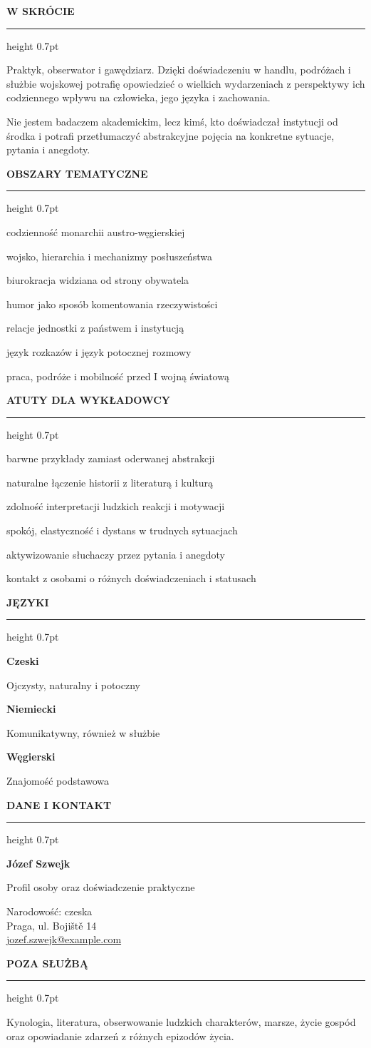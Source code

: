 \documentclass[9pt,a4paper]{article}
\newcommand{\cvsection}[2]{%
  \vspace{0.40em}%
  {\color{#1}\bfseries\fontsize{9.4}{10.6}\selectfont
    \MakeUppercase{#2}\par}%
  \vspace{0.06em}%
  {\color{#1}\hrule height 0.7pt}%
  \vspace{0.14em}%
}
\newcommand{\sideitem}[2]{%
  {\color{navy}\bfseries #1}\par
  {\color{ink}#2\par}
  \vspace{0.13em}%
}
\newcommand{\cvbullet}[1]{%
  \noindent{\color{gold}\textbullet}\hspace{0.42em}#1\par
  \vspace{0.13em}%
}
\begin{document}
\noindent
\begin{minipage}[t]{0.295\textwidth}
\vspace{0pt}

\colorbox{pale}{%
  \begin{minipage}[t]{\dimexpr\linewidth-2\fboxsep\relax}
  \vspace{0.14em}
  \raggedright
  \fontsize{8.45}{9.9}\selectfont

  \cvsection{teal}{W skrócie}
  Praktyk, obserwator i gawędziarz. Dzięki doświadczeniu w handlu,
  podróżach i służbie wojskowej potrafię opowiedzieć o wielkich
  wydarzeniach z perspektywy ich codziennego wpływu na człowieka,
  jego języka i zachowania.

  Nie jestem badaczem akademickim, lecz kimś, kto doświadczał
  instytucji od środka i potrafi przetłumaczyć abstrakcyjne pojęcia
  na konkretne sytuacje, pytania i anegdoty.

  \cvsection{teal}{Obszary tematyczne}
  \cvbullet{codzienność monarchii austro-węgierskiej}
  \cvbullet{wojsko, hierarchia i mechanizmy posłuszeństwa}
  \cvbullet{biurokracja widziana od strony obywatela}
  \cvbullet{humor jako sposób komentowania rzeczywistości}
  \cvbullet{relacje jednostki z państwem i instytucją}
  \cvbullet{język rozkazów i język potocznej rozmowy}
  \cvbullet{praca, podróże i mobilność przed I wojną światową}

  \cvsection{teal}{Atuty dla wykładowcy}
  \cvbullet{barwne przykłady zamiast oderwanej abstrakcji}
  \cvbullet{naturalne łączenie historii z literaturą i kulturą}
  \cvbullet{zdolność interpretacji ludzkich reakcji i motywacji}
  \cvbullet{spokój, elastyczność i dystans w trudnych sytuacjach}
  \cvbullet{aktywizowanie słuchaczy przez pytania i anegdoty}
  \cvbullet{kontakt z osobami o różnych doświadczeniach i statusach}

  \cvsection{teal}{Języki}
  \sideitem{Czeski}{Ojczysty, naturalny i potoczny}
  \sideitem{Niemiecki}{Komunikatywny, również w służbie}
  \sideitem{Węgierski}{Znajomość podstawowa}

  \cvsection{teal}{Dane i kontakt}
  \sideitem{Józef Szwejk}{Profil osoby oraz doświadczenie praktyczne}
  Narodowość: czeska\\
  Praga, ul. Bojiště 14\\
  \href{mailto:jozef.szwejk@example.com}
    {jozef.szwejk@example.com}

  \cvsection{teal}{Poza służbą}
  Kynologia, literatura, obserwowanie ludzkich charakterów,
  marsze, życie gospód oraz opowiadanie zdarzeń z różnych epizodów życia.

  \vspace{0.14em}
  \end{minipage}%
}

\end{minipage}
\end{document}
